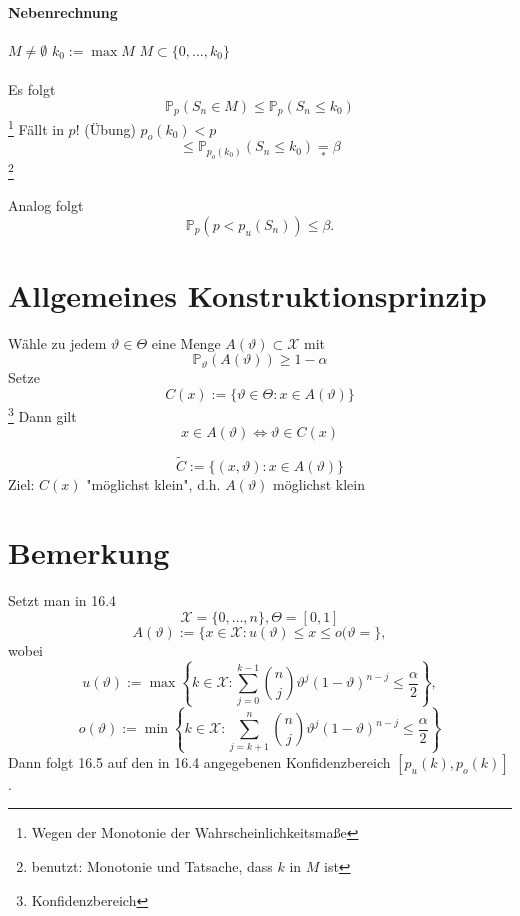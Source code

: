 \documentclass[a4paper,11pt,notitlepage]{report}
\newcommand{\Prim}{{\ensuremath{\mathbb{P}}}}
\begin{document}
\paragraph{Nebenrechnung}
$M \neq \emptyset$ \newline
$k_0 := \max M$ \newline
$M \subset \{0, \ldots, k_0\}$

\paragraph{}
Es folgt
$$\Prim_p(S_n \in M) \leq \Prim_p(S_n \leq k_0)$$ \footnote{Wegen der Monotonie der Wahrscheinlichkeitsmaße}
Fällt in $p$! (Übung)
\newline
$p_o(k_0) < p$
$$\leq \Prim_{p_o(k_0)}(S_n \leq k_0) \underset{*}{=} \beta$$ \footnote{benutzt: Monotonie und Tatsache, dass $k$ in $M$ ist}

Analog folgt
$$\Prim_p(p < p_u(S_n)) \leq \beta.$$

\section{Allgemeines Konstruktionsprinzip}
Wähle zu jedem $\vartheta \in \Theta$ eine Menge $A(\vartheta) \subset \mathcal{X}$ mit
$$\Prim_\vartheta(A(\vartheta)) \geq 1 - \alpha$$
Setze
$$C(x):= \{ \vartheta \in \Theta \colon x \in A(\vartheta)\}$$\footnote{Konfidenzbereich}
Dann gilt
$$x \in A(\vartheta) \Leftrightarrow \vartheta \in C(x)$$
\begin{center}
	
\end{center}
$$\widetilde{C}:= \{(x, \vartheta) \colon x \in A(\vartheta)\}$$
Ziel: $C(x)$ "möglichst klein", d.h. $A(\vartheta)$ möglichst klein

\section{Bemerkung}
Setzt man in 16.4
$$\mathcal{X} = \{0, \ldots, n\}, \Theta = [0,1]$$
$$A(\vartheta) := \{x \in \mathcal{X} \colon u(\vartheta) \leq x \leq o(\vartheta= \},$$
wobei
$$u(\vartheta) := \max \left \{k \in \mathcal{X} \colon \sum\limits_{j=0}^{k-1}{{n \choose j} \vartheta^j (1-\vartheta)^{n-j} \leq \frac{\alpha}{2}} \right \},$$
$$o(\vartheta) := \min \left \{ k \in \mathcal{X} \colon \sum\limits_{j=k+1}^n{{n \choose j} \vartheta^j (1-\vartheta)^{n-j}} \leq \frac{\alpha}{2} \right \}$$
Dann folgt 16.5 auf den in 16.4 angegebenen Konfidenzbereich $[p_u(k), p_o(k)]$.
\end{document}
